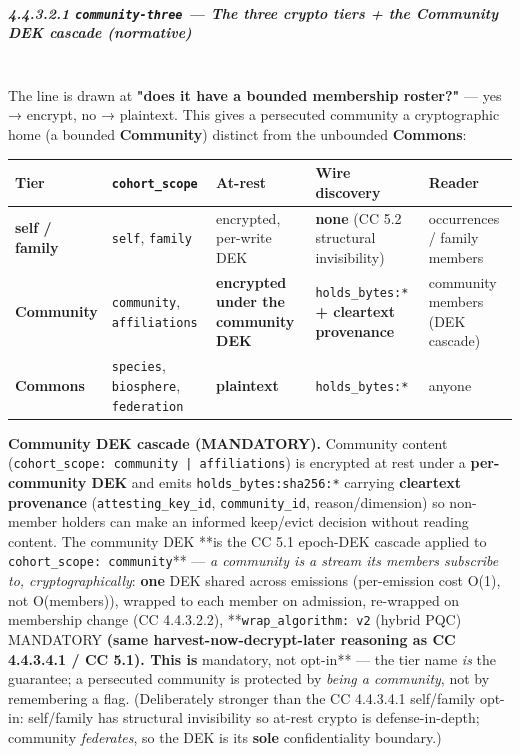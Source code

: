 \documentclass[11pt]{article}
\begin{document}
\subparagraph{4.4.3.2.1 \texttt{community-three} — The three crypto tiers + the Community DEK cascade (normative)}\mbox{}\\


The line is drawn at \textbf{"does it have a bounded membership roster?"} — yes → encrypt, no → plaintext. This gives a persecuted community a cryptographic home (a bounded \textbf{Community}) distinct from the unbounded \textbf{Commons}:


{\scriptsize
\begin{longtable}{|p{3.2cm}|p{3.2cm}|p{3.2cm}|p{3.2cm}|p{3.2cm}|}\hline
\textbf{Tier} & \textbf{\texttt{cohort\_scope}} & \textbf{At-rest} & \textbf{Wire discovery} & \textbf{Reader} \\ \hline\endhead
\textbf{self / family} & \texttt{self}, \texttt{family} & encrypted, per-write DEK & \textbf{none} (CC 5.2 structural invisibility) & occurrences / family members \\ \hline
\textbf{Community} & \texttt{community}, \texttt{affiliations} & \textbf{encrypted under the community DEK} & \texttt{holds\_bytes:*} \textbf{+ cleartext provenance} & community members (DEK cascade) \\ \hline
\textbf{Commons} & \texttt{species}, \texttt{biosphere}, \texttt{federation} & \textbf{plaintext} & \texttt{holds\_bytes:*} & anyone \\ \hline
\end{longtable}}


\textbf{Community DEK cascade (MANDATORY).} Community content (\texttt{cohort\_scope: community | affiliations}) is encrypted at rest under a \textbf{per-community DEK} and emits \texttt{holds\_bytes:sha256:*} carrying \textbf{cleartext provenance} (\texttt{attesting\_key\_id}, \texttt{community\_id}, reason/dimension) so non-member holders can make an informed keep/evict decision without reading content. The community DEK **is the CC 5.1 epoch-DEK cascade applied to \texttt{cohort\_scope: community}** — \textit{a community is a stream its members subscribe to, cryptographically}: \textbf{one} DEK shared across emissions (per-emission cost O(1), not O(members)), wrapped to each member on admission, re-wrapped on membership change (CC 4.4.3.2.2), **\texttt{wrap\_algorithm: v2} (hybrid PQC) MANDATORY\textbf{ (same harvest-now-decrypt-later reasoning as CC 4.4.3.4.1 / CC 5.1). This is }mandatory, not opt-in** — the tier name \textit{is} the guarantee; a persecuted community is protected by \textit{being a community}, not by remembering a flag. (Deliberately stronger than the CC 4.4.3.4.1 self/family opt-in: self/family has structural invisibility so at-rest crypto is defense-in-depth; community \textit{federates}, so the DEK is its \textbf{sole} confidentiality boundary.)
\end{document}
